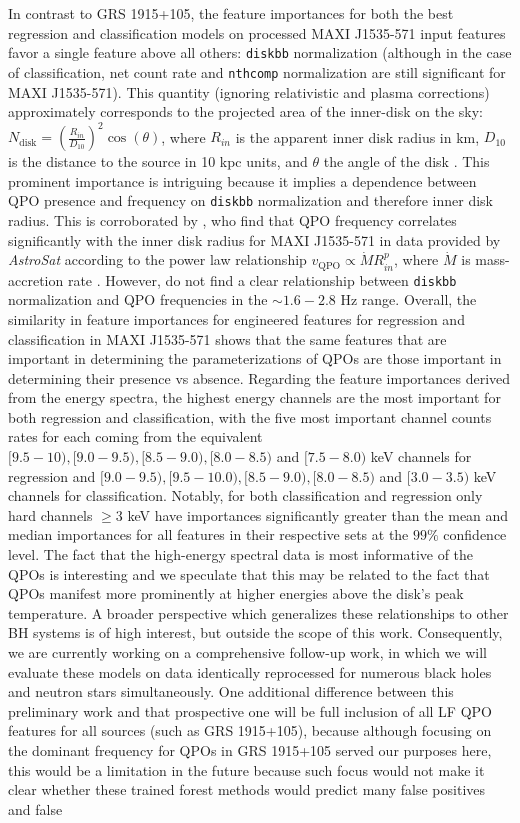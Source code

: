 \documentclass[fleqn,usenatbib,twocolumn]{mnras}%
\begin{document}
In contrast to GRS 1915+105, the feature importances for both the best regression and classification models on processed MAXI J1535-571 input features favor a single feature above all others: \texttt{diskbb} normalization (although in the case of classification, net count rate and \texttt{nthcomp} normalization are still significant for MAXI J1535-571). This quantity (ignoring relativistic and plasma corrections) approximately corresponds to the projected area of the inner-disk on the sky: $N_{\mathrm{disk}}=(\frac{R_{in}}{D_{10}})^2\cos(\theta)$, where $R_{in}$ is the apparent inner disk radius in km, $D_{10}$ is the distance to the source in 10 kpc units, and $\theta$ the angle of the disk \citep{XSPEC1999}. This prominent importance is intriguing because it implies a dependence between QPO presence and frequency on \texttt{diskbb} normalization and therefore inner disk radius. This is corroborated by \cite{gargEnergyDependence}, who find that QPO frequency correlates significantly with the inner disk radius for MAXI J1535-571 in data provided by \textit{AstroSat} according to the power law relationship $v_{\mathrm{QPO}}\propto \dot{M} R_{in}^p$, where $\dot{M}$ is mass-accretion rate \citep{astrosat}. However, \citep{gargEnergyDependence} do not find a clear relationship between \texttt{diskbb} normalization and QPO frequencies in the $\sim1.6-2.8$ Hz range. Overall, the similarity in feature importances for engineered features for regression and classification in MAXI J1535-571 shows that the same features that are  important in determining the parameterizations of QPOs are those important in determining their presence vs absence. Regarding the feature importances derived from the energy spectra, the highest energy channels are the most important for both regression and classification, with the five most important channel counts rates for each coming from the equivalent $[9.5-10), [9.0-9.5), [8.5-9.0), [8.0-8.5)$ and $[7.5-8.0)$ keV channels for regression and $[9.0-9.5), [9.5-10.0), [8.5-9.0), [8.0-8.5)$ and $[3.0-3.5)$ keV channels for classification. Notably, for both classification and regression only hard channels $\geq 3$ keV have importances significantly greater than the mean and median importances for all features in their respective sets at the $99\%$ confidence level. The fact that the high-energy spectral data is most informative of the QPOs is interesting and we speculate that this may be related to the fact that QPOs manifest more prominently at higher energies above the disk’s peak temperature. A broader perspective which generalizes these relationships to other BH systems is of high interest, but outside the scope of this work. Consequently, we are currently working on a comprehensive follow-up work, in which we will evaluate these models on data identically reprocessed for numerous black holes and neutron stars simultaneously. One additional difference between this preliminary work and that prospective one will be full inclusion of all LF QPO features for all sources (such as GRS 1915+105), because although focusing on the dominant frequency for QPOs in GRS 1915+105 served our purposes here, this would be a limitation in the future because such focus would not make it clear whether these trained forest methods would predict many false positives and false 
\end{document}
